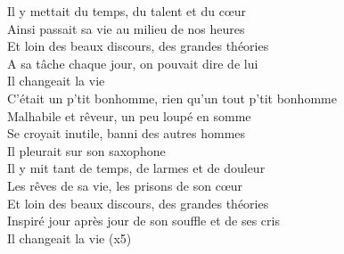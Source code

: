 \documentclass{novel}
\begin{document}
{\begin{minipage}[b][0.55\textheight][t]{\textwidth}
\begin{multicols}{2}
Il y mettait du temps, du talent et du cœur \\
Ainsi passait sa vie au milieu de nos heures \\
Et loin des beaux discours, des grandes théories \\
A sa tâche chaque jour, on pouvait dire de lui \\
Il changeait la vie \\

C'était un p'tit bonhomme, rien qu'un tout p'tit bonhomme \\
Malhabile et rêveur, un peu loupé en somme \\
Se croyait inutile, banni des autres hommes \\

Il pleurait sur son saxophone \\

Il y mit tant de temps, de larmes et de douleur \\
Les rêves de sa vie, les prisons de son cœur \\
Et loin des beaux discours, des grandes théories \\
Inspiré jour après jour de son souffle et de ses cris \\
Il changeait la vie (x5) \\
\end{multicols}
\end{minipage}
}


\newpage
\normalsize
\end{document}
